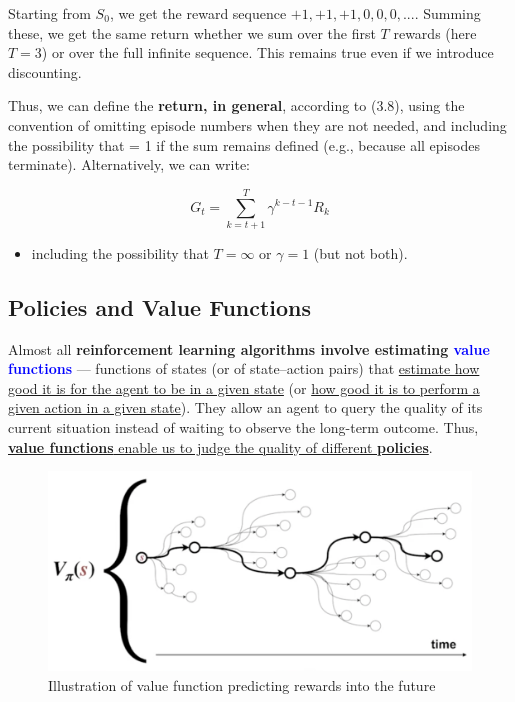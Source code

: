 \documentclass[12pt, a4paper]{article}
\begin{document}
Starting from \(S_0\), we get the reward sequence
\(+1, +1, +1, 0, 0, 0,...\). Summing these, we get the same return
whether we sum over the first \(T\) rewards (here \(T = 3\)) or over the
full infinite sequence. This remains true even if we introduce
discounting.

Thus, we can define the \textbf{return, in general}, according to (3.8),
using the convention of omitting episode numbers when they are not
needed, and including the possibility that = 1 if the sum remains
defined (e.g., because all episodes terminate). Alternatively, we can
write:

\[G_t = \sum_{k=t+1}^T \gamma^{k-t-1} R_k\]

\begin{itemize}
\item
  including the possibility that \(T = \infty\) or \(\gamma = 1\) (but
  not both).
\end{itemize}







\subsection{Policies and Value Functions}\label{policies-and-value-functions}

Almost all \textbf{reinforcement learning algorithms involve estimating
\textcolor{blue}{value functions}} --- functions of states (or of state--action
pairs) that \uline{estimate how good it is for the agent to be in a given state} (or \uline{how good it is to perform a given action in a given state}). They allow an agent to query the quality of its current situation instead of waiting to observe the long-term outcome. Thus, \uline{\textbf{value functions} enable us to judge the quality of different \textbf{policies}}.

\begin{figure}[H]
  \centering  %
    \includegraphics[width=0.8\columnwidth]{images/value-function-predicting-rewards.png}
    \caption{Illustration of value function predicting rewards into the future}
    \label{fig:value-function-predicting-rewards}
\end{figure}
\end{document}
